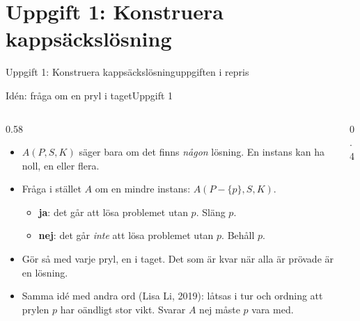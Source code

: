 \documentclass[aspectratio=169,10pt]{beamer}
\newcommand{\ja}{\textcolor{okgreen}{\textbf{ja}}}
\newcommand{\nej}{\textcolor{badred}{\textbf{nej}}}
\begin{document}
\section{Uppgift 1: Konstruera kappsäckslösning}

\begin{frame}{Uppgift 1: Konstruera kappsäckslösning}{uppgiften i repris}
  \uppgiftEtt
\end{frame}

\begin{frame}{Idén: fråga om en pryl i taget}{Uppgift 1}
  \begin{columns}[T]
    \begin{column}{0.58\textwidth}
      \begin{itemize}
        \item<1-> $A(P,S,K)$ säger bara om det finns \emph{någon} lösning. En instans kan ha noll, en eller flera.
        \item<2-> Fråga i stället $A$ om en mindre instans: $A(P-\{p\},S,K)$.
          \begin{itemize}
            \item<3-> \ja: det går att lösa problemet utan $p$. Släng $p$.
            \item<4-> \nej: det går \emph{inte} att lösa problemet utan $p$. Behåll $p$.
          \end{itemize}
        \item<5-> Gör så med varje pryl, en i taget. Det som är kvar när alla är prövade är en lösning.
        \item<6-> Samma idé med andra ord (Lisa Li, 2019): låtsas i tur och ordning att prylen $p$ har oändligt stor vikt. Svarar $A$ nej måste $p$ vara med.
      \end{itemize}
    \end{column}
    \begin{column}{0.4\textwidth}
      \centering
    \end{column}
  \end{columns}
\end{frame}
\end{document}
